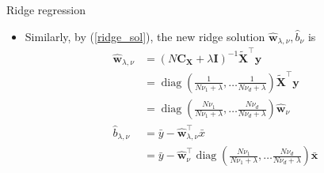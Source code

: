 \documentclass{beamer}
\numberwithin{equation}{section}
\newcommand{\aref}[1]{\alert{\ref{#1}}}
\begin{document}
\begin{frame}{Ridge regression}
    \begin{itemize}
        \item
        Similarly, by (\aref{ridge_sol}), the new ridge solution
        $ \hat{\mathbf{w}}_{\lambda, \nu}, \hat{b}_\nu $ is
        \begin{equation} \label{ridge_sol_diag}
            \begin{split}
                \hat{\mathbf{w}}_{\lambda, \nu} & =
                (N\mathbf{C}_\mathbf{X} + \lambda\mathbf{I})^{-1}
                \tilde{\mathbf{X}}^\top\mathbf{y} \\
                & = \operatorname{diag}\left(
                    \frac{1}{N\nu_1 + \lambda}, \ldots
                    \frac{1}{N\nu_d + \lambda}
                \right)\tilde{\mathbf{X}}^\top\mathbf{y} \\
                & = \boxed{
                    \operatorname{diag}\left(
	                    \frac{N\nu_1}{N\nu_1 + \lambda}, \ldots
	                    \frac{N\nu_d}{N\nu_d + \lambda}
	                \right)\hat{\mathbf{w}}_\nu
	            } \\
	            \hat{b}_{\lambda, \nu} & = \bar{y} -
                \hat{\mathbf{w}}_{\lambda, \nu}^\top\bar{x} \\
                & = \boxed{
	                \bar{y} - \hat{\mathbf{w}}_\nu^\top
	                \operatorname{diag}\left(
		                \frac{N\nu_1}{N\nu_1 + \lambda}, \ldots
	                    \frac{N\nu_d}{N\nu_d + \lambda}
	                \right)\bar{\mathbf{x}}
	            }
            \end{split}
        \end{equation}
    \end{itemize}
\end{frame}
\end{document}
